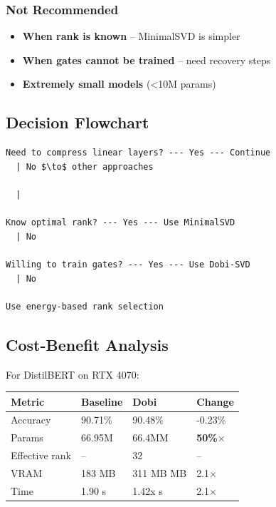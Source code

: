 \subsubsection{Not Recommended}

\begin{itemize}
\item \textbf{When rank is known} -- MinimalSVD is simpler
\item \textbf{When gates cannot be trained} -- need recovery steps
\item \textbf{Extremely small models} (<10M params)

\end{itemize}
\subsection{Decision Flowchart}

\begin{lstlisting}
Need to compress linear layers? --- Yes --- Continue
  | No $\to$ other approaches

  |
   
Know optimal rank? --- Yes --- Use MinimalSVD
  | No
   
Willing to train gates? --- Yes --- Use Dobi-SVD
  | No
   
Use energy-based rank selection
\end{lstlisting}

\subsection{Cost-Benefit Analysis}

For DistilBERT on RTX 4070:

\begin{table}[H]
\centering
\small
\begin{tabular}{llll}
\toprule
\textbf{Metric} & \textbf{Baseline} & \textbf{Dobi} & \textbf{Change} \\
\midrule
Accuracy & 90.71\% & 90.48\% & -0.23\% \\
Params & 66.95M & 66.4MM & \textbf{50\%$\times$} \\
Effective rank & -- & 32 & -- \\
VRAM & 183 MB & 311 MB MB & 2.1$\times$ \\
Time & 1.90 s & 1.42x s & 2.1$\times$ \\
\bottomrule
\end{tabular}
\end{table}

